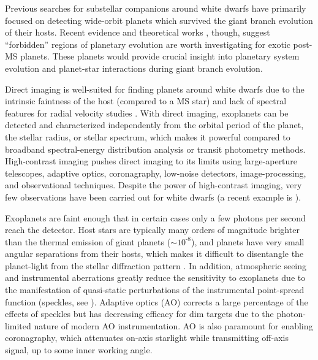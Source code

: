 \documentclass[twocolumn,linenumbers]{aastex631}
\begin{document}
Previous searches for substellar companions around white dwarfs \citep[e.g.,][]{debesAreThereUnstable2002,hoganDODOSurveyII2009,luhmanDiscoveryCandidateCoolest2011,xuExtremeAOSearchGiant2015a} have primarily focused on detecting wide-orbit planets which survived the giant branch evolution of their hosts. Recent evidence and theoretical works \citep[e.g.,][]{xuSpitzerObservationsWhite2012,koesterFrequencyPlanetaryDebris2014,verasPostmainsequencePlanetarySystem2016,vanderburgGiantPlanetCandidate2020}, though, suggest ``forbidden'' regions of planetary evolution are worth investigating for exotic post-MS planets. These planets would provide crucial insight into planetary system evolution and planet-star interactions during giant branch evolution.

Direct imaging is well-suited for finding planets around white dwarfs due to the intrinsic faintness of the host (compared to a MS star) and lack of spectral features for radial velocity studies \citep{burleighImagingPlanetsNearby2002a}. With direct imaging, exoplanets can be detected and characterized independently from the orbital period of the planet, the stellar radius, or stellar spectrum, which makes it powerful compared to broadband spectral-energy distribution analysis or transit photometry methods. High-contrast imaging pushes direct imaging to its limits using large-aperture telescopes, adaptive optics, coronagraphy, low-noise detectors, image-processing, and observational techniques. Despite the power of high-contrast imaging, very few observations have been carried out for white dwarfs (a recent example is \citealt{pathakHighContrastImaging2021}).

Exoplanets are faint enough that in certain cases only a few photons per second reach the detector. Host stars are typically many orders of magnitude brighter than the thermal emission of giant planets ($\sim10^{\text{-}8}$), and planets have very small angular separations from their hosts, which makes it difficult to disentangle the planet-light from the stellar diffraction pattern \citep{traubDirectImagingExoplanets2010}. In addition, atmospheric seeing and instrumental aberrations greatly reduce the sensitivity to exoplanets due to the manifestation of quasi-static perturbations of the instrumental point-spread function (speckles, see \citealp{guyonExtremeAdaptiveOptics2018}). Adaptive optics (AO) corrects a large percentage of the effects of speckles but has decreasing efficacy for dim targets due to the photon-limited nature of modern AO instrumentation. AO is also paramount for enabling coronagraphy, which attenuates on-axis starlight while transmitting off-axis signal, up to some inner working angle.
\end{document}
